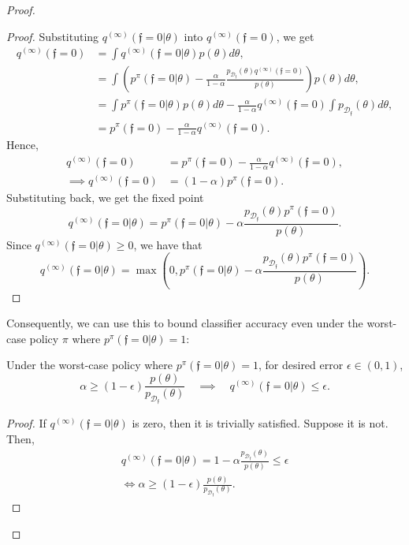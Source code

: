 \documentclass{article} %
\newcommand{\feas}{\mathfrak{f}}
\newcommand{\MeasuredCISet}{\mathcal{D}_{\feas{}}}
\begin{document}
\begin{proof}
\begin{proof}
Substituting $q^{(\infty)}(\feas{}=0 | \theta)$ into $q^{(\infty)}(\feas{} = 0)$, we get
\begin{align}
    q^{(\infty)}(\feas{} = 0)
    &= \int q^{(\infty)}(\feas{}=0 | \theta) p(\theta) d\theta, \\
    &= \int \left( p^\pi(\feas{}=0 | \theta) - \frac{\alpha}{1-\alpha} \frac{ p_{\MeasuredCISet}(\theta) q^{(\infty)}(\feas{} = 0) }{ p(\theta) } \right) p(\theta) d\theta, \\
    &= \int p^\pi(\feas{}=0 | \theta) p(\theta) d\theta - \frac{\alpha}{1-\alpha} q^{(\infty)}(\feas{} = 0) \int p_{\MeasuredCISet}(\theta) d\theta, \\
    &= p^\pi(\feas{}=0) - \frac{\alpha}{1-\alpha} q^{(\infty)}(\feas{} = 0).
\end{align}
Hence,
\begin{align}
    q^{(\infty)}(\feas{} = 0)
    &= p^\pi(\feas{}=0) - \frac{\alpha}{1-\alpha} q^{(\infty)}(\feas{} = 0), \\
    \implies
    q^{(\infty)}(\feas{} = 0)
    &= (1-\alpha) p^\pi(\feas{}=0).
\end{align}
Substituting back, we get the fixed point
\begin{equation}
    q^{(\infty)}(\feas{}=0 | \theta)
    = p^\pi(\feas{}=0 | \theta) - \alpha \frac{ p_{\MeasuredCISet}(\theta) p^\pi(\feas{}=0) }{ p(\theta) }.
\end{equation}
Since $q^{(\infty)}(\feas{}=0 | \theta) \geq 0$, we have that
\begin{equation}
    q^{(\infty)}(\feas{}=0 | \theta) = \max \left( 0, p^\pi(\feas{}=0 | \theta) - \alpha \frac{ p_{\MeasuredCISet}(\theta) p^\pi(\feas{}=0) }{ p(\theta) } \right).
\end{equation}
\end{proof}

Consequently, we can use this to bound classifier accuracy even under the worst-case policy $\pi$ where $p^\pi(\feas{}=0 | \theta) = 1$:
\begin{prop} \label{prop:clsfy_worst_policy_bound}
    Under the worst-case policy where $p^\pi(\feas{}=0 | \theta) = 1$, for desired error $\epsilon \in (0, 1)$,
    \begin{equation}
        \alpha \geq (1-\epsilon) \frac{p(\theta)}{p_{\MeasuredCISet}(\theta)} \quad \implies \quad
        q^{(\infty)}(\feas{}=0 | \theta) \leq \epsilon.
    \end{equation}
\end{prop}
\begin{proof}
If $q^{(\infty)}(\feas{}=0 | \theta)$ is zero, then it is trivially satisfied. Suppose it is not. Then,
    \begin{align}
        q^{(\infty)}(\feas{}=0 | \theta) = 1 - \alpha \frac{ p_{\MeasuredCISet}(\theta) }{ p(\theta) } \leq \epsilon \\
        \iff \alpha \geq (1-\epsilon) \frac{p(\theta)}{p_{\MeasuredCISet}(\theta)}.
    \end{align}
\end{proof}


\end{proof}
\end{document}
